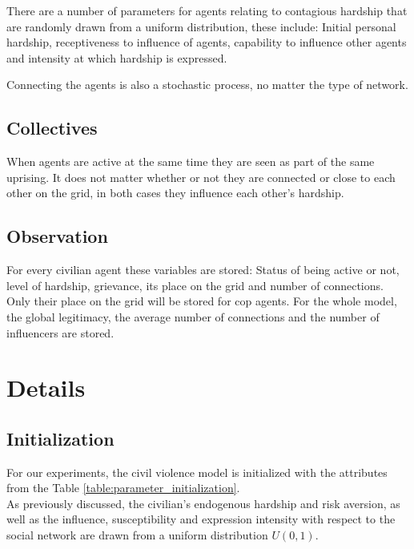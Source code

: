 \documentclass[10pt]{article}
\begin{document}
    There are a number of parameters for agents relating to contagious hardship that are randomly drawn from a uniform distribution, these include: Initial personal hardship, receptiveness to influence of agents, capability to influence other agents and intensity at which hardship is expressed.

    Connecting the agents is also a stochastic process, no matter the type of network.

    \subsection{Collectives}
    When agents are active at the same time they are seen as part of the same uprising. It does not matter whether or not they are connected or close to each other on the grid, in both cases they influence each other's hardship.

    \subsection{Observation}
    For every civilian agent these variables are stored: Status of being active or not, level of hardship, grievance, its place on the grid and number of connections. Only their place on the grid will be stored for cop agents. For the whole model, the global legitimacy, the average number of connections and the number of influencers are stored.

    \section{Details}

    \subsection{Initialization}
    \label{section:model_initialisation}

    For our experiments, the civil violence model is initialized with the attributes from the Table \ref{table:parameter_initialization}.\\
    As previously discussed, the civilian's endogenous hardship and risk aversion, as well as the influence, susceptibility and expression intensity with respect to the social network are drawn from a uniform distribution $U(0, 1)$.
\end{document}
